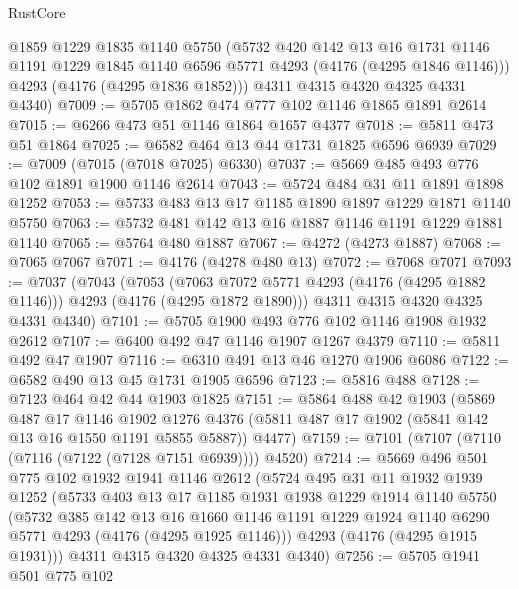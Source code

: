 \begin{lexlean}{RustCore}
\begin{coremodule}
        @1859
        @1229
        @1835
        @1140
        @5750
        (@5732
          @420
          @142
          @13
          @16
          @1731
          @1146
          @1191
          @1229
          @1845
          @1140
          @6596
          @5771
          @4293
          (@4176 (@4295 @1846 @1146)))
        @4293
        (@4176 (@4295 @1836 @1852)))
      @4311
      @4315
      @4320
      @4325
      @4331
      @4340)
@7009 := @5705 @1862 @474 @777 @102 @1146 @1865 @1891 @2614
@7015 := @6266 @473 @51 @1146 @1864 @1657 @4377
@7018 := @5811 @473 @51 @1864
@7025 := @6582 @464 @13 @44 @1731 @1825 @6596 @6939
@7029 := @7009 (@7015 (@7018 @7025) @6330)
@7037 := @5669 @485 @493 @776 @102 @1891 @1900 @1146 @2614
@7043 := @5724 @484 @31 @11 @1891 @1898 @1252
@7053 := @5733 @483 @13 @17 @1185 @1890 @1897 @1229 @1871 @1140 @5750
@7063 := @5732 @481 @142 @13 @16 @1887 @1146 @1191 @1229 @1881 @1140
@7065 := @5764 @480 @1887
@7067 := @4272 (@4273 @1887)
@7068 := @7065 @7067
@7071 := @4176 (@4278 @480 @13)
@7072 := @7068 @7071
@7093 := @7037
    (@7043
      (@7053
        (@7063 @7072 @5771 @4293 (@4176 (@4295 @1882 @1146)))
        @4293
        (@4176 (@4295 @1872 @1890)))
      @4311
      @4315
      @4320
      @4325
      @4331
      @4340)
@7101 := @5705 @1900 @493 @776 @102 @1146 @1908 @1932 @2612
@7107 := @6400 @492 @47 @1146 @1907 @1267 @4379
@7110 := @5811 @492 @47 @1907
@7116 := @6310 @491 @13 @46 @1270 @1906 @6086
@7122 := @6582 @490 @13 @45 @1731 @1905 @6596
@7123 := @5816 @488
@7128 := @7123 @464 @42 @44 @1903 @1825
@7151 := @5864
    @488
    @42
    @1903
    (@5869
      @487
      @17
      @1146
      @1902
      @1276
      @4376
      (@5811 @487 @17 @1902 (@5841 @142 @13 @16 @1550 @1191 @5855 @5887))
      @4477)
@7159 := @7101 (@7107 (@7110 (@7116 (@7122 (@7128 @7151 @6939)))) @4520)
@7214 := @5669
    @496
    @501
    @775
    @102
    @1932
    @1941
    @1146
    @2612
    (@5724
      @495
      @31
      @11
      @1932
      @1939
      @1252
      (@5733
        @403
        @13
        @17
        @1185
        @1931
        @1938
        @1229
        @1914
        @1140
        @5750
        (@5732
          @385
          @142
          @13
          @16
          @1660
          @1146
          @1191
          @1229
          @1924
          @1140
          @6290
          @5771
          @4293
          (@4176 (@4295 @1925 @1146)))
        @4293
        (@4176 (@4295 @1915 @1931)))
      @4311
      @4315
      @4320
      @4325
      @4331
      @4340)
@7256 := @5705
    @1941
    @501
    @775
    @102

\end{coremodule}
\end{lexlean}
